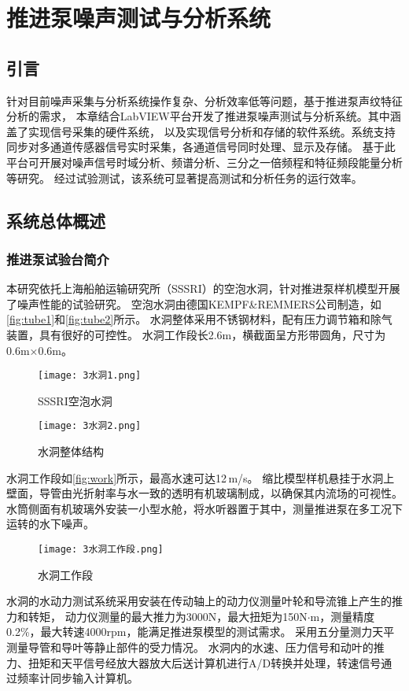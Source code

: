 \chapter{推进泵噪声测试与分析系统}
\section{引言}
针对目前噪声采集与分析系统操作复杂、分析效率低等问题，基于推进泵声纹特征分析的需求，
本章结合LabVIEW平台开发了推进泵噪声测试与分析系统。其中涵盖了实现信号采集的硬件系统，
以及实现信号分析和存储的软件系统。系统支持同步对多通道传感器信号实时采集，各通道信号同时处理、显示及存储。
基于此平台可开展对噪声信号时域分析、频谱分析、三分之一倍频程和特征频段能量分析等研究。
经过试验测试，该系统可显著提高测试和分析任务的运行效率。
\section{系统总体概述}
\subsection{推进泵试验台简介}
本研究依托上海船舶运输研究所（SSSRI）的空泡水洞，针对推进泵样机模型开展了噪声性能的试验研究。
空泡水洞由德国KEMPF\&REMMERS公司制造，如\autoref{fig:tube1}和\autoref{fig:tube2}所示。
水洞整体采用不锈钢材料，配有压力调节箱和除气装置，具有很好的可控性。
水洞工作段长2.6m，横截面呈方形带圆角，尺寸为0.6m×0.6m。
\begin{figure}[htbp]
    \centering
    \texttt{[image: 3水洞1.png]}
    \caption{\label{fig:tube1}SSSRI空泡水洞}
\end{figure}
\begin{figure}[htbp]
    \centering
    \texttt{[image: 3水洞2.png]}
    \caption{\label{fig:tube2}水洞整体结构}
\end{figure}

水洞工作段如\autoref{fig:work}所示，最高水速可达12\,m/s。
缩比模型样机悬挂于水洞上壁面，导管由光折射率与水一致的透明有机玻璃制成，以确保其内流场的可视性。
水筒侧面有机玻璃外安装一小型水舱，将水听器置于其中，测量推进泵在多工况下运转的水下噪声。
\begin{figure}[htbp]
    \centering
    \texttt{[image: 3水洞工作段.png]}
    \caption{\label{fig:work}水洞工作段}
\end{figure}

水洞的水动力测试系统采用安装在传动轴上的动力仪测量叶轮和导流锥上产生的推力和转矩，
动力仪测量的最大推力为3000N，最大扭矩为150N$\cdot$m，测量精度0.2\%，最大转速4000rpm，能满足推进泵模型的测试需求。
采用五分量测力天平测量导管和导叶等静止部件的受力情况。
水洞内的水速、压力信号和动叶的推力、扭矩和天平信号经放大器放大后送计算机进行A/D转换并处理，转速信号通过频率计同步输入计算机。

